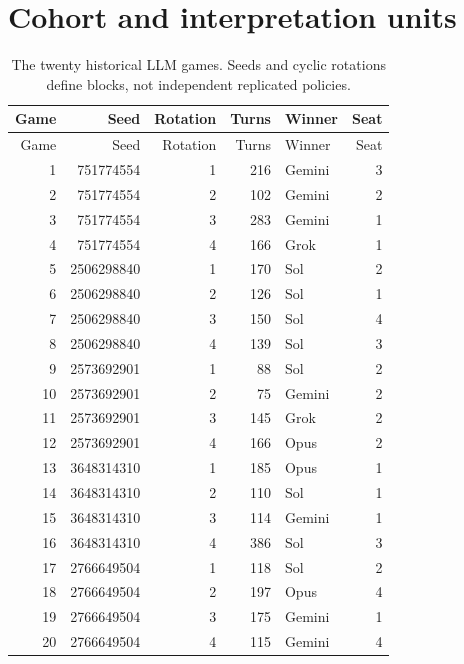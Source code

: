 \section{Cohort and interpretation units}

\begin{longtable}{rrrrlr}
\caption{The twenty historical LLM games. Seeds and cyclic rotations define blocks, not independent replicated policies.}\label{tab:cohort}\\
\toprule Game & Seed & Rotation & Turns & Winner & Seat\\\midrule\endfirsthead
\toprule Game & Seed & Rotation & Turns & Winner & Seat\\\midrule\endhead
1 & 751774554 & 1 & 216 & Gemini & 3\\
2 & 751774554 & 2 & 102 & Gemini & 2\\
3 & 751774554 & 3 & 283 & Gemini & 1\\
4 & 751774554 & 4 & 166 & Grok & 1\\
5 & 2506298840 & 1 & 170 & Sol & 2\\
6 & 2506298840 & 2 & 126 & Sol & 1\\
7 & 2506298840 & 3 & 150 & Sol & 4\\
8 & 2506298840 & 4 & 139 & Sol & 3\\
9 & 2573692901 & 1 & 88 & Sol & 2\\
10 & 2573692901 & 2 & 75 & Gemini & 2\\
11 & 2573692901 & 3 & 145 & Grok & 2\\
12 & 2573692901 & 4 & 166 & Opus & 2\\
13 & 3648314310 & 1 & 185 & Opus & 1\\
14 & 3648314310 & 2 & 110 & Sol & 1\\
15 & 3648314310 & 3 & 114 & Gemini & 1\\
16 & 3648314310 & 4 & 386 & Sol & 3\\
17 & 2766649504 & 1 & 118 & Sol & 2\\
18 & 2766649504 & 2 & 197 & Opus & 4\\
19 & 2766649504 & 3 & 175 & Gemini & 1\\
20 & 2766649504 & 4 & 115 & Gemini & 4\\\bottomrule
\end{longtable}

